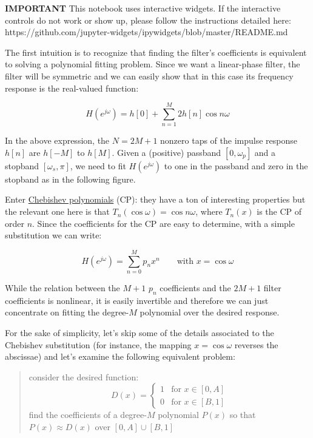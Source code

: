 \documentclass[11pt]{article}
\begin{document}
    \textbf{IMPORTANT} This notebook uses interactive widgets. If the
interactive controls do not work or show up, please follow the
instructions detailed here:
https://github.com/jupyter-widgets/ipywidgets/blob/master/README.md

    The first intuition is to recognize that finding the filter's
coefficients is equivalent to solving a polynomial fitting problem.
Since we want a linear-phase filter, the filter will be symmetric and we
can easily show that in this case its frequency response is the
real-valued function:

\[
    H(e^{j\omega}) = h[0] + \sum_{n = 1}^{M} 2h[n]\cos n\omega
\]

In the above expression, the \(N = 2M+1\) nonzero taps of the impulse
response \(h[n]\) are \(h[-M]\) to \(h[M]\). Given a (positive) passband
\([0, \omega_p]\) and a stopband \([\omega_s, \pi]\), we need to fit
\(H(e^{j\omega})\) to one in the passband and zero in the stopband as in
the following figure.

Enter
\href{https://en.wikipedia.org/wiki/Chebyshev_polynomials}{Chebishev
polynomials} (CP): they have a ton of interesting properties but the
relevant one here is that \(T_n(\cos\omega) = \cos n\omega\), where
\(T_n(x)\) is the CP of order \(n\). Since the coefficients for the CP
are easy to determine, with a simple substitution we can write:

\[
   H(e^{j\omega}) =  \sum_{n = 0}^{M}p_n x^n \qquad \mbox{with $x = \cos\omega$}
\]

While the relation between the \(M+1\) \(p_n\) coefficients and the
\(2M+1\) filter coefficients is nonlinear, it is easily invertible and
therefore we can just concentrate on fitting the degree-\(M\) polynomial
over the desired response.

    For the sake of simplicity, let's skip some of the details associated to
the Chebishev substitution (for instance, the mapping \(x=\cos\omega\)
reverses the abscissae) and let's examine the following equivalent
problem:

\begin{quote}
consider the desired function:
\[ D(x) = \begin{cases} 1 & \mbox{for $x\in [0, A]$} \\ 0 & \mbox{for $x\in [B,1]$} \end{cases}\]
find the coefficients of a degree-\(M\) polynomial \(P(x)\) so that
\(P(x)\approx D(x)\) over \([0,A]\cup [B,1]\)
\end{quote}
\end{document}
